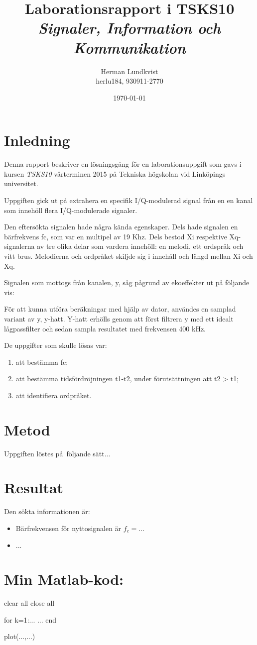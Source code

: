 \documentclass[10pt,twocolumn]{article}
\title{Laborationsrapport i TSKS10 \emph{Signaler, Information och Kommunikation}}
\author{Herman Lundkvist \\ herlu184, 930911-2770 }
\date{\today}
\begin{document}
\maketitle

\section{Inledning}

Denna rapport beskriver en lösningsgång för en laborationsuppgift som gavs i
kursen \emph{TSKS10} vårterminen 2015 på Tekniska högskolan vid Linköpings
universitet.

Uppgiften gick ut på extrahera en specifik I/Q-modulerad signal från en en
kanal som innehöll flera I/Q-modulerade signaler.


Den eftersökta signalen hade några kända egenskaper. Dels hade signalen en
bärfrekvens fc, som var en multipel av 19 Khz. Dels bestod Xi respektive
Xq-signalerna av tre olika delar som vardera innehöll: en melodi, ett ordspråk
och vitt brus. Melodierna och ordpråket skiljde sig i
innehåll och längd mellan Xi och Xq.

Signalen som mottogs från kanalen, y, såg pågrund av ekoeffekter ut på
följande vis:

För att kunna utföra beräkningar med hjälp av dator, användes en samplad
variant av y, y-hatt. Y-hatt erhölls genom att först filtrera y med ett idealt
lågpassfilter och sedan sampla resultatet med frekvensen 400 kHz.

De uppgifter som skulle lösas var:
\begin{enumerate}
\item att bestämma fc;
\item att bestämma tidsfördröjningen t1-t2, under förutsättningen att
t2 > t1;
\item att identifiera ordpråket.
\end{enumerate}

\section{Metod}

Uppgiften l\"ostes p\aa\ f\"oljande s\"att...

\section{Resultat}

Den sökta informationen \"ar:
\begin{itemize}
\item B\"arfrekvensen f\"or nyttosignalen \"ar $f_c=...$
\item ...
\end{itemize}

\clearpage

\section*{Min Matlab-kod:}
\begin{spverbatim}
clear all
close all

for k=1:...
  ...
end

plot(...,...)
\end{spverbatim}
\end{document}
